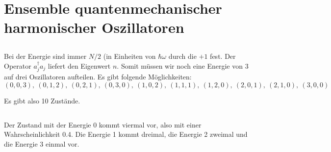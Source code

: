 \subsection{}

\section{Ensemble quantenmechanischer harmonischer Oszillatoren}

\subsection{}

Bei der Energie sind immer $N/2$ (in Einheiten von $\hbar\omega$ durch die $+1$ fest. Der Operator $a_j^\dagger a_j$ liefert den Eigenwert $n$. Somit müssen wir noch eine Energie von 3 auf drei Oszillatoren aufteilen. Es gibt folgende Möglichkeiten:
\[
    (0, 0, 3),\:
    (0, 1, 2),\:
    (0, 2, 1),\:
    (0, 3, 0),\:
    (1, 0, 2),\:
    (1, 1, 1),\:
    (1, 2, 0),\:
    (2, 0, 1),\:
    (2, 1, 0),\:
    (3, 0, 0)
\]

Es gibt also 10 Zustände.

\subsection{}

Der Zustand mit der Energie 0 kommt viermal vor, also mit einer Wahrscheinlichkeit \num{.4}. Die Energie 1 kommt dreimal, die Energie 2 zweimal und die Energie 3 einmal vor.

\subsection{}
\subsection{}
\subsection{}

